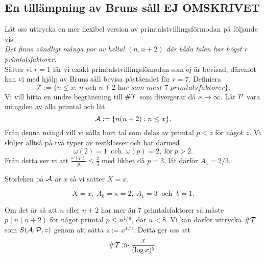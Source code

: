 



\subsection{En tillämpning av Bruns såll EJ OMSKRIVET}
Låt oss uttrycka en mer flexibel version av primtalstvillingsförmodan på följande vis:\\
\textit{Det finns oändligt många par av heltal $(n, n+2)$ där båda talen har högst $r$ primtalsfaktorer.}\\
Sätter vi $r=1$ får vi exakt primtalstvillingsfömodan som ej är bevisad, däremot kan vi med hjälp av Bruns såll bevisa påståendet för $r=7$.
Definiera
\begin{equation*}
    \mathcal{T} := \{\textit{$n\leq x$: $n$ och $n+2$ har som mest $7$ primtalsfaktorer}\}.
\end{equation*}
Vi vill hitta en undre begränsning till $\card{\mathcal{T}}$ som divergerar då $x\to\infty$. Låt $\P$ vara mängden av alla primtal och låt
\begin{equation*}
    \A := \{n(n+2): n\leq x\}.
\end{equation*}
Från denna mängd vill vi sålla bort tal som delas av primtal $p<z$ för något $z$.
Vi skiljer alltså på två typer av restklasser och har därmed
\begin{equation*}
    \omega(2)=1\ \text{ och }\ \omega(p)=2,\ \text{för}\ p>2.
\end{equation*}
Från detta ser vi att $\frac{\omega(p)}{p}\leq\frac{2}{3}$ med likhet då $p=3$, låt därför $A_1=2/3$.

Storleken på $\A$ är $x$ så vi sätter $X=x$,


\begin{equation*}
    X=x,\ 
    A_0=\kappa=2,\ 
    A_1=3\
    \text{ och }\
    b=1.
\end{equation*}


Om det är så att $n$ eller $n+2$ har mer än 7 primtalsfaktorer så måste $p\mid n(n+2)$ för något primtal $p\leq n^{1/u}$, där $u<8$.
Vi kan därför uttrycka $\card\mathcal{T}$ som $\S{A}{P}{z}$ genom att sätta $z := x^{1/u}$. Detta ger oss att
\begin{equation*}
    \card\mathcal{T} \gg \frac{x}{(\log x)^2}.
\end{equation*}






\begin{comment}

två funktioner $g_U$ och $g_L$ som uppfyller 
\begin{alignat*}{3}
    g_U(1)&=1,\quad \text{och}&\quad \mu(d)(g_U(d)-g_U(pd)) &\geq 0, \\
    g_L(1)&=1,\quad \text{och}&\quad \mu(d)(g_L(d)-g_L(pd)) &\leq 0,
\end{alignat*}






\end{comment}